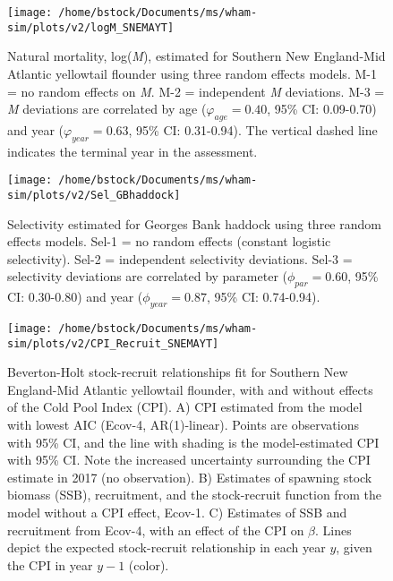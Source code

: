 \documentclass[]{article}
\begin{document}
\pagebreak

\begin{figure}

{\centering \texttt{[image: /home/bstock/Documents/ms/wham-sim/plots/v2/logM\_SNEMAYT]} 

}

\caption{Natural mortality, log(\textit{M}), estimated for Southern New England-Mid Atlantic yellowtail flounder using three random effects models. M-1 = no random effects on \textit{M}. M-2 = independent \textit{M} deviations. M-3 = \textit{M} deviations are correlated by age ($\varphi_{age} = 0.40$, 95\% CI: 0.09-0.70) and year ($\varphi_{year} = 0.63$, 95\% CI: 0.31-0.94). The vertical dashed line indicates the terminal year in the assessment.}\label{fig:devs-snemayt-m}
\end{figure}

\pagebreak

\begin{figure}

{\centering \texttt{[image: /home/bstock/Documents/ms/wham-sim/plots/v2/Sel\_GBhaddock]} 

}

\caption{Selectivity estimated for Georges Bank haddock using three random effects models. Sel-1 = no random effects (constant logistic selectivity). Sel-2 = independent selectivity deviations. Sel-3 = selectivity deviations are correlated by parameter ($\phi_{par} = 0.60$, 95\% CI: 0.30-0.80) and year ($\phi_{year} = 0.87$, 95\% CI: 0.74-0.94).}\label{fig:devs-GBhaddock-sel}
\end{figure}

\pagebreak

\begin{figure}

{\centering \texttt{[image: /home/bstock/Documents/ms/wham-sim/plots/v2/CPI\_Recruit\_SNEMAYT]} 

}

\caption{Beverton-Holt stock-recruit relationships fit for Southern New England-Mid Atlantic yellowtail flounder, with and without effects of the Cold Pool Index (CPI). A) CPI estimated from the model with lowest AIC (Ecov-4, AR(1)-linear). Points are observations with 95\% CI, and the line with shading is the model-estimated CPI with 95\% CI. Note the increased uncertainty surrounding the CPI estimate in 2017 (no observation). B) Estimates of spawning stock biomass (SSB), recruitment, and the stock-recruit function from the model without a CPI effect, Ecov-1. C) Estimates of SSB and recruitment from Ecov-4, with an effect of the CPI on $\beta$. Lines depict the expected stock-recruit relationship in each year $y$, given the CPI in year $y-1$ (color).}\label{fig:devs-SNEMAYT-ecov}
\end{figure}
\end{document}
